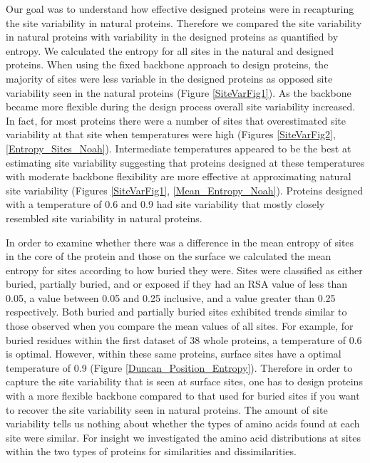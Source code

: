 \documentclass[12pt]{article}
\begin{document}
\par Our goal was to understand how effective designed proteins were in recapturing the site variability in natural proteins. Therefore we compared the site variability in natural proteins with variability in the designed proteins as quantified by entropy.  We calculated the entropy for all sites in the natural and designed proteins. When using the fixed backbone approach to design proteins, the majority of sites were less variable in the designed proteins as opposed site variability seen in the natural proteins (Figure \ref{SiteVarFig1}). As the backbone became more flexible during the design process overall site variability increased. In fact, for most proteins there were a number of sites that overestimated site variability at that site when temperatures were high (Figures \ref{SiteVarFig2}, \ref{Entropy_Sites_Noah}). Intermediate temperatures appeared to be the best at estimating site variability suggesting that proteins designed at these temperatures with moderate backbone flexibility are more effective at approximating natural site variability (Figures \ref{SiteVarFig1}, \ref{Mean_Entropy_Noah}). Proteins designed with a temperature of 0.6 and 0.9 had site variability that mostly closely resembled site variability in natural proteins.
 \par In order to examine whether there was a difference in the mean entropy of sites in the core of the protein and those on the surface we calculated the mean entropy for sites according to how buried they were. Sites were classified as either buried, partially buried, and or exposed if they had an RSA value of less than 0.05, a value between 0.05 and 0.25 inclusive, and a value greater than 0.25 respectively. Both buried and partially buried sites exhibited trends similar to those observed when you compare the mean values of all sites. For example, for buried residues within the first dataset of 38 whole proteins, a temperature of 0.6 is optimal. However, within these same proteins, surface sites have a optimal temperature of 0.9 (Figure \ref{Duncan_Position_Entropy}). Therefore in order to capture the site variability that is seen at surface sites, one has to design proteins with a more flexible backbone compared to that used for buried sites if you want to recover the site variability seen in natural proteins. The amount of site variability tells us nothing about whether the types of amino acids found at each site were similar. For insight we investigated the amino acid distributions at sites within the two types of proteins for similarities and dissimilarities. 
\end{document}
